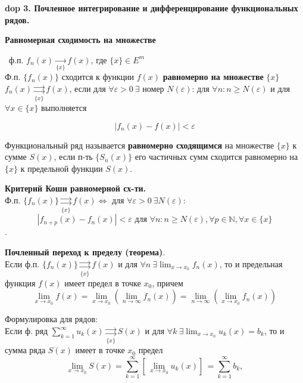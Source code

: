 \setcounter{section}{4}
\setcounter{subsection}{3}
\setcounter{equation}{0}
\textbf{\LARGE dop 3. Почленное интегрирование и дифференцирование функциональных рядов.}

\textbf{Равномерная сходимость на множестве}

\mathLet \ ф.п. $f_n(x) \xrightarrow[\{x\}]{}  f(x)$, где $\{x\} \in E^m$ \\
Ф.п. $\{f_n(x)\}$ сходится к функции $f(x)$ \textbf{равномерно на множестве} $\{x\}$ \ $f_n(x)\underset{\{x\}}{\rightrightarrows}f(x)$, если для $\forall \varepsilon > 0 \ \exists$ номер $N(\varepsilon)$: для $\forall n: n \ge N(\varepsilon)$ и для $\forall x \in \{x\}$ выполняется

\begin{equation}
    |f_n(x) - f(x)| < \varepsilon
\end{equation}

\bigbreak
Функциональный ряд называется \textbf{равномерно сходящимся} на множестве $\{x\}$ к сумме $S(x)$, если п-ть $\{S_n(x)\}$ его частичных сумм сходится равномерно на $\{x\}$ к предельной функции $S(x)$.

\bigbreak
\textbf{Критерий Коши равномерной сх-ти.} \\
Ф.п. $\{f_n(x)\}\underset{\{x\}}{\rightrightarrows}f(x) \Leftrightarrow $ для $\forall \varepsilon > 0 \ \exists N(\varepsilon): $
$$
    |f_{n+p}(x) - f_n(x)| < \varepsilon \text{ для } \forall n: n \ge N(\varepsilon), \forall p \in \mathbb{N}, \forall x \in \{x\}
$$.

\bigbreak
\textbf{Почленный переход к пределу (теорема)}. \\
Если ф.п. $\{f_n(x)\} \underset{\{x\}}{\rightrightarrows}f(x)$ и для $\forall n \ \exists \lim_{x \rightarrow x_0}{f_n(x)} $, то и предельная функция $f(x)$ имеет предел в точке $x_0$, причем
\begin{equation}
    \lim_{x \rightarrow x_0}{f(x)} = \lim_{x \rightarrow x_0}{(\lim_{n \rightarrow \infty}{f_n(x)})} = \lim_{n \rightarrow \infty}{(\lim_{x \rightarrow x_0}{f_n(x)})}
\end{equation}
\bigbreak

Формулировка для рядов: \\
Если ф. ряд $\sum_{k=1}^{\infty}u_k(x)  \underset{\{x\}}{\rightrightarrows}S(x)$ и для $\forall k \ \exists \lim_{x \rightarrow x_0}{u_k(x)} = b_k$, то и сумма ряда $S(x)$ имеет в точке $x_0$ предел
$$
    \lim_{x \rightarrow x_0}{S(x)} = \sum_{k=1}^{\infty}[\,\lim_{x \rightarrow x_0}{u_k(x)}]\, = \sum_{k=1}^{\infty} b_k,
$$


